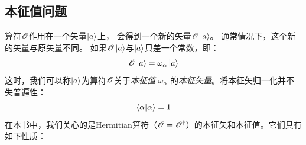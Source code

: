 

\subsection{本征值问题}
\label{sec:1.1.6}
算符$\mathscr{O}$作用在一个矢量$\Ket{a}$上，
会得到一个新的矢量$\mathscr{O}\Ket{a}$。
通常情况下，这个新的矢量与原矢量不同。
如果$\mathscr{O}\Ket{a}$与$\Ket{a}$只差一个常数，即：
\begin{equation}
 \mathscr{O}\Ket{a} = \omega_{\alpha}\Ket{a}
 \label{eq:1.72}
\end{equation}
这时，我们可以称$\Ket{a}$为算符$\mathscr{O}$关于\emph{本征值} $\omega_{\alpha}$ 的\emph{本征矢量}。将本征矢归一化并不失普遍性：
\begin{equation}
 \langle \alpha \vert \alpha \rangle = 1
 \label{eq:1.73}
\end{equation}
在本书中，我们关心的是Hermitian算符（$\mathscr{O}=\mathscr O^\dagger$）的本征矢和本征值。它们具有如下性质：
